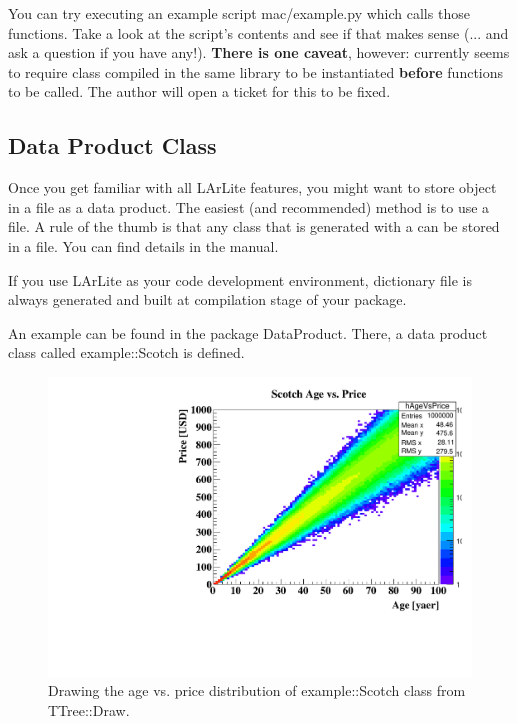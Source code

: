 You can try executing an example script {\ttfamily mac/example.py} which calls those functions. 
Take a look at the script's contents and see if that makes sense (... and ask a question if you have any!).
{\color{red}\bf There is one caveat}, however: currently \ROOT seems to require \CPP class compiled
in the same library to be instantiated {\bf before} \CPP functions to be called. The author will
open a ticket for this to be fixed.

\subsection{\ROOT Data Product Class}
Once you get familiar with all LArLite features, you might want to store \CPP object in a file
as a {\ttfamily data product}. The easiest (and recommended) method is to use a \ROOT file.
A rule of the thumb is that any \CPP class that is generated with a  can
be stored in a \ROOT file. You can find details in the \ROOT manual.

If you use LArLite as your code development environment, \ROOT dictionary file is always
generated and built at compilation stage of your package. 

An example can be found in the package {\ttfamily DataProduct}.
There, a data product class called {\ttfamily example::Scotch} is defined. 

\begin{figure}[htb]\begin{center}
\includegraphics[width=12cm]{./img/ScotchAgeVsPrice.pdf}
\caption{ 
Drawing the age vs. price distribution of {\ttfamily example::Scotch} class from {\ttfamily TTree::Draw}.
}
\end{center}\end{figure}

